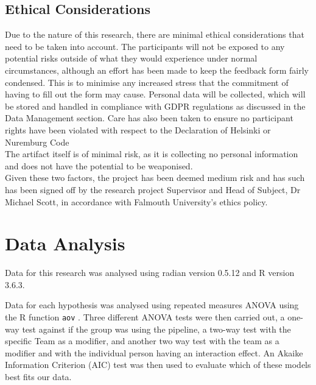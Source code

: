 \documentclass[journal]{IEEEtran}
\begin{document}
\subsection{Ethical Considerations}\label{Ethics}
Due to the nature of this research, there are minimal ethical considerations that need to be taken into account. The participants will not be exposed to any potential risks outside of what they would experience under normal circumstances, although an effort has been made to keep the feedback form fairly condensed. This is to minimise any increased stress that the commitment of having to fill out the form may cause. Personal data will be collected, which will be stored and handled in compliance with GDPR regulations as discussed in the Data Management section. Care has also been taken to ensure no participant rights have been violated with respect to the Declaration of Helsinki\cite{goodyear2007declaration} or Nuremburg Code\cite{code1949nuremberg}\\
The artifact itself is of minimal risk, as it is collecting no personal information and does not have the potential to be weaponised. \\
Given these two factors, the project has been deemed medium risk and has such has been signed off by the research project Supervisor and Head of Subject, Dr Michael Scott, in accordance with Falmouth University's ethics policy\cite{falethicspolicy}.

\lstset{language = R}
\section{Data Analysis}
    Data for this research was analysed using radian version 0.5.12 and R version 3.6.3.

    Data for each hypothesis was analysed using repeated measures ANOVA \cite{carvadiaANOVA} using the R function \lstinline{aov} \cite{RaovDocs}. Three different ANOVA tests were then carried out, a one-way test against if the group was using the pipeline, a two-way test with the specific Team as a modifier, and another two way test with the team as a modifier and with the individual person having an interaction effect. An Akaike Information Criterion (AIC) \cite{AIC} test was then used to evaluate which of these models best fits our data. \\
\end{document}
